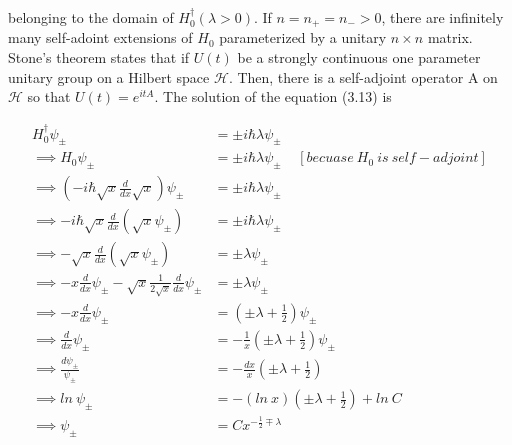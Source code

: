 \documentclass[12pt]{report}
\newcommand*{\1}{\hspace{1pt}}
\begin{document}
        belonging to the domain of $H_{0}^{\dagger}(\lambda>0)$. If $n=n_{+}=n_{-}>0$, there are infinitely many self-adoint extensions of $H_{0}$ parameterized by a 
        unitary $n\times n$ matrix. Stone's theorem states that if $U(t)$ be a strongly continuous one parameter unitary group on a Hilbert space $\mathcal{H}$. 
        Then, there is a self-adjoint operator A on $\mathcal{H}$ so that $U(t) = e^{itA}$. The solution of the equation (3.13) is 

        \begin{align*}
            H_{0}^{\dagger} \psi_{\pm} &= \pm i \hbar \lambda \psi_{\pm} \\ 
            \implies H_{0} \psi_{\pm} &= \pm i \hbar \lambda \psi_{\pm} \ \ \ \ \ [becuase\ H_{0} \ is \ self-adjoint] \\
            \implies \left(-i\hbar \sqrt{x} \frac{d}{dx}\sqrt{x}\right)\psi_{\pm} &= \pm i \hbar \lambda \psi _{\pm} \\
            \implies -i\hbar \sqrt{x} \frac{d}{dx}\left(\sqrt{x}\psi_{\pm}\right) &= \pm i \hbar \lambda \psi _{\pm} \\
            \implies -\sqrt{x} \frac{d}{dx}\left(\sqrt{x}\psi_{\pm}\right) &= \pm \lambda \psi _{\pm} \\
            \implies -x\frac{d}{dx}\psi_{\pm} - \sqrt{x}\frac{1}{2\sqrt{x}} \frac{d}{dx}\psi_{\pm} &= \pm \lambda \psi _{\pm} \\
            \implies -x\frac{d}{dx}\psi_{\pm} &= \left(\pm \lambda + \frac{1}{2}\right) \psi _{\pm} \\
            \implies \frac{d}{dx}\psi_{\pm} &= -\frac{1}{x}\left(\pm \lambda + \frac{1}{2}\right) \psi _{\pm} \\
            \implies \frac{d\psi_{\pm}}{\psi_{\pm}} &= -\frac{dx}{x}\left(\pm \lambda + \frac{1}{2}\right) \\
            \implies ln \ \psi_{\pm} &= -\left(ln \ x\right)\left(\pm \lambda + \frac{1}{2}\right) + ln \ C\\
            \implies \psi_{\pm} &=  Cx^{- \frac{1}{2}\mp \lambda}\\
        \end{align*}
\end{document}

